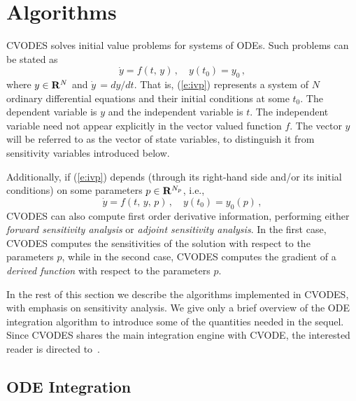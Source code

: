\section{Algorithms}\label{s:algorithms}

CVODES solves initial value problems for systems of ODEs. 
Such problems can be stated as
\begin{equation}\label{e:ivp}
\dot{y} = f(t,\,y) \, , \quad y(t_0) = y_0 \, ,
\end{equation}
where $y \in {\bf R}^N$ and $\dot{y}\,=dy/dt$.
That is, (\ref{e:ivp}) represents a system of $N$ ordinary
differential equations and their initial conditions at some $t_0$. The
dependent variable is $y$ and the independent variable is $t$. The
independent variable need not appear explicitly in the vector valued
function $f$. The vector $y$ will be referred to as the vector of
state variables, to distinguish it from sensitivity variables introduced below.

Additionally, if (\ref{e:ivp}) depends (through its right-hand side and/or its initial
conditions) on some parameters $p \in {\bf R}^{N_p}$, i.e.,
\begin{equation}\label{e:ivp_p}
\dot{y}  = f(t,\,y,\,p) \, , \quad y(t_0)  = y_0(p) \, ,
\end{equation}
CVODES can also compute first order derivative information, performing either
{\em forward sensitivity analysis} or {\em adjoint sensitivity analysis}.
In the first case, CVODES computes the sensitivities of the solution with respect to the 
parameters $p$, while in the second case, CVODES computes the gradient of a 
{\em derived function} with respect to the parameters $p$.

In the rest of this section we describe the algorithms implemented in CVODES,
with emphasis on sensitivity analysis. We give only a 
brief overview of the ODE integration algorithm to introduce some of the
quantities needed in the sequel. 
Since CVODES shares the main integration engine with CVODE, the interested reader is
directed to~\cite{HBGLSSW:03}.


\subsection{ODE Integration}\label{ss:integration}

